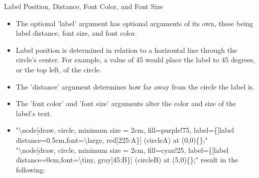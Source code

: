 \documentclass{beamer}
\begin{document}
	
	\begin{frame}[t, label=frameA]{Label Position, Distance, Font Color, and Font Size}
		\begin{itemize}
			\item{The optional 'label' argument has optional arguments of its own, these being label distance, font size, and font color.}
			\item{Label position is determined in relation to a horizontal line through the circle's center. For example, a value of 45 would place the label to 45 degrees, or the top left, of the circle.}
			\item{The 'distance' argument determines how far away from the circle the label is.}
			\item{The 'font color' and 'font size' arguments alter the color and size of the label's text.}
			\item{\tiny "\textbackslash{}node[draw, circle, minimum size = 2cm, fill=purple!75, label=\{[label distance=0.5cm,font=\textbackslash{}large, red]225:A\}] (circleA) at (0,0)\{\};" \\
				"\textbackslash{}node[draw, circle, minimum size = 2cm, fill=cyan!25, label=\{[label distance=0cm,font=\textbackslash{}tiny,
				gray]45:B\}] (circleB) at (5,0)\{\};" \large result in the following:}
		\end{itemize}
	\end{frame}
	
\end{document}
